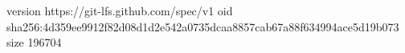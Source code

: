 version https://git-lfs.github.com/spec/v1
oid sha256:4d359ee9912f82d08d1d2e542a0735dcaa8857cab67a88f634994ace5d19b073
size 196704
